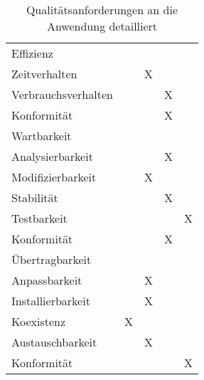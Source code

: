 \begin{table}[H]
\begin{tabular}{lcccc}
		\rowcolor{MidnightBlue!15}
		Effizienz	 						&					&				&					&							\\
		\hspace{1.5em} Zeitverhalten		&					&	X			& 					&							\\
		\hspace{1.5em} Verbrauchsverhalten	&					&				& X					&							\\		
		\hspace{1.5em} Konformität			&					&				& X					&							\\
		
		\rowcolor{MidnightBlue!15}
		Wartbarkeit 						&					&				&					&							\\
		\hspace{1.5em} Analysierbarkeit		&					&				& X					&							\\
		\hspace{1.5em} Modifizierbarkeit	&					&	X			& 					&							\\
		\hspace{1.5em} Stabilität			&					&				& X					&							\\
		\hspace{1.5em} Testbarkeit			&					&				& 					&	X						\\		
		\hspace{1.5em} Konformität			&					&				& X					&							\\
		
		\rowcolor{MidnightBlue!15}
		Übertragbarkeit 					&					&				&					&							\\
		\hspace{1.5em} Anpassbarkeit		&					&	X			& 					&							\\
		\hspace{1.5em} Installierbarkeit	&					&	X			& 					&							\\
		\hspace{1.5em} Koexistenz			&	X				&				& 					&							\\
		\hspace{1.5em} Austauschbarkeit		&					&	X			& 					&							\\		
		\hspace{1.5em} Konformität			&					&				& 					&	X						\\
		
	
	\end{tabular}
	\caption{Qualitätsanforderungen an die Anwendung detailliert}
	\label{tab:qualitaetsanforderungen}
\end{table}